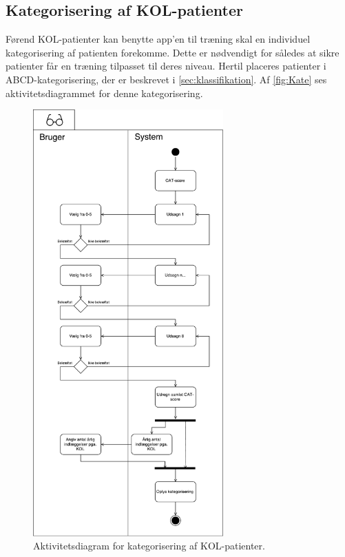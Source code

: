 \subsection{Kategorisering af KOL-patienter} \label{sec:kategorisering}
Førend KOL-patienter kan benytte app'en til træning skal en individuel kategorisering af patienten forekomme. Dette er nødvendigt for således at sikre patienter får en træning tilpasset til deres niveau. 
Hertil placeres patienter i ABCD-kategorisering, der er beskrevet i \autoref{sec:klassifikation}. Af \autoref{fig:Kate} ses aktivitetsdiagrammet for denne kategorisering.

\begin{figure} [H]
\centering
\includegraphics[width=0.65\textwidth]{figures/aktivitetsdiagram/Kategorisering}
\caption{Aktivitetsdiagram for kategorisering af KOL-patienter.}
\label{fig:Kate}
\end{figure}

